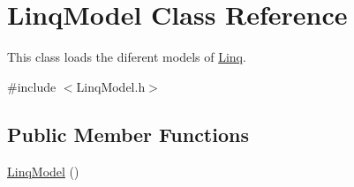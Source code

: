 \hypertarget{classLinqModel}{
\section{LinqModel Class Reference}
\label{classLinqModel}
}


This class loads the diferent models of \hyperlink{classLinq}{Linq}.  




{\ttfamily \#include $<$LinqModel.h$>$}

\subsection*{Public Member Functions}
\begin{DoxyCompactItemize}
\item 
\hyperlink{classLinqModel_a6e14a12514a58d4ab064549cfee41b93}{LinqModel} ()
\end{DoxyCompactItemize}
